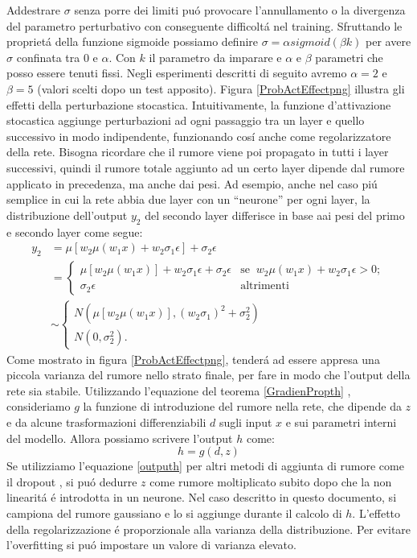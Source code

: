 \documentclass[a4paper,10pt]{article}
\begin{document}
 Addestrare $\sigma$ senza porre dei limiti pu\'o provocare l'annullamento o la divergenza del parametro perturbativo con conseguente difficolt\'a nel training. Sfruttando le propriet\'a della funzione sigmoide possiamo definire $\sigma = \alpha sigmoid(\beta k)$ per avere $\sigma$ confinata tra $0$ e $\alpha$. Con $k$ il parametro da imparare e $\alpha$ e $\beta$ parametri che posso essere tenuti fissi. Negli esperimenti descritti di seguito avremo $\alpha = 2$ e $\beta = 5$ (valori scelti dopo un test apposito). Figura \ref{ProbActEffectpng} illustra gli effetti della perturbazione stocastica. Intuitivamente, la funzione d'attivazione stocastica aggiunge perturbazioni ad ogni passaggio tra un layer e quello successivo in modo indipendente, funzionando cos\'i anche come regolarizzatore della rete. Bisogna ricordare che il rumore viene poi propagato in tutti i layer successivi, quindi il rumore totale aggiunto ad un certo layer dipende dal rumore applicato in precedenza, ma anche dai pesi. Ad esempio, anche nel caso pi\'u semplice in cui la rete abbia due layer con un ``neurone'' per ogni layer, la distribuzione dell'output $y_2$ del secondo layer differisce in base aai pesi del primo e secondo layer come segue:
 \begin{align}
  y_2 &= \mu \left[ w_2\mu\left(w_1 x\right) + w_2\sigma_1\epsilon\right] + \sigma_2\epsilon\\
  &= 
  \begin{cases}
   \mu\left[ w_2\mu\left(w_1 x\right)\right] + w_2\sigma_1\epsilon + \sigma_2\epsilon & \mbox{se} \;\; w_2\mu\left(w_1 x\right) + w_2\sigma_1\epsilon>0;\\
   \sigma_2\epsilon & \mbox{altrimenti}
  \end{cases} \\
  &\sim 
  \begin{cases}
   N\left(\mu\left[w_2\mu\left(w_1 x\right)\right],\left(w_2\sigma_1\right)^2 + \sigma_2^2\right)\\
   N\left(0,\sigma_2^2\right).
  \end{cases}
 \end{align}
 Come mostrato in figura \ref{ProbActEffectpng}, tender\'a ad essere appresa una piccola varianza del rumore nello strato finale, per fare in modo che l'output della rete sia stabile. Utilizzando l'equazione del teorema \ref{GradienPropth} , consideriamo $g$ la funzione di introduzione del rumore nella rete, che dipende da $z$ e da alcune trasformazioni differenziabili $d$ sugli input $x$ e sui parametri interni del modello. Allora possiamo scrivere l'output $h$ come:
 \begin{equation}
  h = g(d,z) \label{outputh}
 \end{equation}
 Se utilizziamo l'equazione \ref{outputh} per altri metodi di aggiunta di rumore come il dropout \cite{cai2019effective}, si pu\'o dedurre $z$  come rumore moltiplicato subito dopo che la non linearit\'a \'e introdotta in un neurone. Nel caso descritto in questo documento, si campiona del rumore gaussiano e lo si aggiunge durante il calcolo di $h$. L'effetto della regolarizzazione \'e proporzionale alla varianza della distribuzione. Per evitare l'overfitting si pu\'o impostare un valore di varianza elevato.
 
\end{document}
